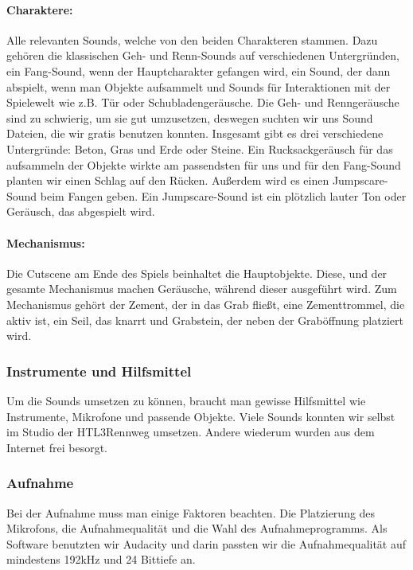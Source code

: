 \paragraph{Charaktere:}
Alle relevanten Sounds, welche von den beiden Charakteren stammen. Dazu gehören die klassischen Geh- und Renn-Sounds auf
verschiedenen Untergründen, ein Fang-Sound, wenn der Hauptcharakter gefangen wird, ein Sound, der dann abspielt, wenn man Objekte aufsammelt
und Sounds für Interaktionen mit der Spielewelt wie z.B. Tür oder Schubladengeräusche. Die Geh- und Renngeräusche sind zu
schwierig, um sie gut umzusetzen, deswegen suchten wir uns Sound Dateien, die wir gratis benutzen konnten. Insgesamt gibt es drei
verschiedene Untergründe: Beton, Gras und Erde oder Steine. Ein Rucksackgeräusch für das aufsammeln der Objekte wirkte am passendsten für uns
und für den Fang-Sound planten wir einen Schlag auf den Rücken.
Außerdem wird es einen Jumpscare-Sound beim Fangen geben. Ein Jumpscare-Sound ist ein plötzlich lauter Ton oder Geräusch, das abgespielt wird.

\paragraph{Mechanismus:}
Die Cutscene am Ende des Spiels beinhaltet die Hauptobjekte. Diese, und der gesamte Mechanismus
machen Geräusche, während dieser ausgeführt wird. Zum Mechanismus gehört der Zement,
der in das Grab fließt, eine Zementtrommel, die aktiv ist, ein Seil, das knarrt und Grabstein, der neben der Graböffnung platziert wird.

\subsubsection{Instrumente und Hilfsmittel}
Um die Sounds umsetzen zu können, braucht man gewisse Hilfsmittel wie Instrumente, Mikrofone und
passende Objekte. Viele Sounds konnten wir selbst im Studio der HTL3Rennweg umsetzen. Andere wiederum wurden aus dem Internet frei besorgt.

\subsubsection{Aufnahme}
Bei der Aufnahme muss man einige Faktoren beachten. Die Platzierung des Mikrofons, die Aufnahmequalität und die Wahl
des Aufnahmeprogramms. Als Software benutzten wir Audacity und darin passten wir die Aufnahmequalität auf mindestens 192kHz und 24 Bittiefe an.

